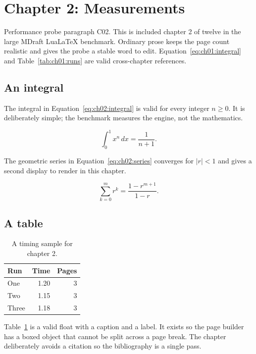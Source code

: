\section{Chapter 2: Measurements}
\label{sec:ch02}

Performance probe paragraph C02. This is included chapter 2 of twelve in
the large MDraft LuaLaTeX benchmark. Ordinary prose keeps the page count
realistic and gives the probe a stable word to edit. Equation~\ref{eq:ch01:integral} and
Table~\ref{tab:ch01:runs} are valid cross-chapter references.

\subsection{An integral}
The integral in Equation~\ref{eq:ch02:integral} is valid for every integer
$n \ge 0$. It is deliberately simple; the benchmark measures the engine, not
the mathematics.

\begin{equation}
  \label{eq:ch02:integral}
  \int_{0}^{1} x^{n}\,dx = \frac{1}{n+1}.
\end{equation}

The geometric series in Equation~\ref{eq:ch02:series} converges for
$|r| < 1$ and gives a second display to render in this chapter.

\begin{equation}
  \label{eq:ch02:series}
  \sum_{k=0}^{m} r^{k} = \frac{1-r^{m+1}}{1-r}.
\end{equation}

\subsection{A table}
\begin{table}[h]
  \centering
  \begin{tabular}{lrr}
    \toprule
    Run & Time & Pages \\
    \midrule
    One   & 1.20 & 3 \\
    Two   & 1.15 & 3 \\
    Three & 1.18 & 3 \\
    \bottomrule
  \end{tabular}
  \caption{A timing sample for chapter 2.}
  \label{tab:ch02:runs}
\end{table}

Table~\ref{tab:ch02:runs} is a valid float with a caption and a label. It
exists so the page builder has a boxed object that cannot be split across a
page break. The chapter deliberately avoids a citation so the bibliography is a single pass.

